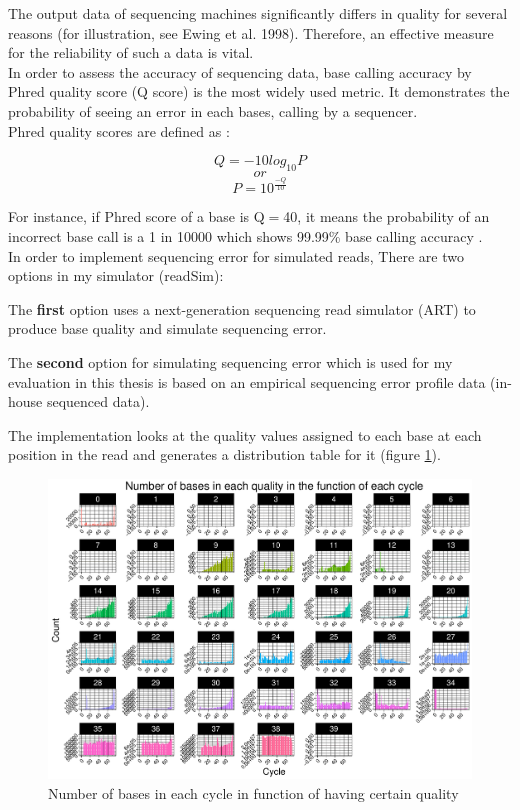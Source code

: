 \documentclass[11pt,a4paper]{report}
\begin{document}
The output data of sequencing machines significantly differs in quality for 
several reasons (for illustration, see Ewing et al. 1998).  Therefore, an effective 
measure for the reliability of such a data is vital\cite{phred1}.\\

In order to assess the accuracy of sequencing data, base calling accuracy by Phred 
quality score (Q score) is the most widely used metric. It demonstrates the probability 
of seeing an error in each bases, calling by a sequencer.\\

Phred quality scores are defined as \cite{phred2}:

$$ Q = -10  log_{10}P   $$
$$  or $$
$$ P = 10 ^ { \frac{-Q}{ 10 } } $$

For instance, if Phred score of a base is Q$=$40, it means the probability of an 
incorrect base call is a 1 in 10000 which shows 99.99\% base calling accuracy 
\cite{IlluminaPhred}. \\  

In order to implement sequencing error for simulated reads, There are two
options in my simulator (readSim):

The \textbf{first} option uses a next-generation sequencing read simulator 
(ART) to produce base quality and simulate sequencing error.


The \textbf{second} option for simulating sequencing error which is used for
my evaluation in this thesis is based on an empirical sequencing error profile 
data (in-house sequenced data).

The implementation looks at the quality values assigned to each base at each
position in the read and generates a distribution table for it (figure \ref{hist}).

\begin{figure}[H]
\centering
\includegraphics[width=12cm]{pictures/Rplot_quality.pdf}
\caption{Number of bases in each cycle in function of having certain quality}
\label{hist}
\end{figure}
\end{document}
